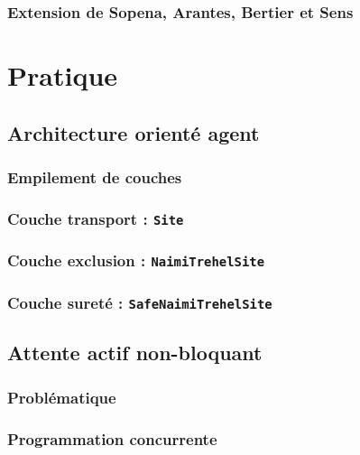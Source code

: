 \documentclass[a4paper,french,towsides,10pt]{book}
\begin{document}
\subsection{Extension de Sopena, Arantes, Bertier et Sens}


\chapter{Pratique}

\section{Architecture orienté agent}
\subsection{Empilement de couches}

\subsection{Couche transport : \texttt{Site}}

\subsection{Couche exclusion : \texttt{NaimiTrehelSite}}

\subsection{Couche sureté : \texttt{SafeNaimiTrehelSite}}


\section{Attente actif non-bloquant}
\subsection{Problématique}

\subsection{Programmation concurrente}

\end{document}
